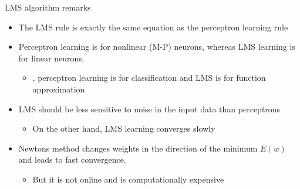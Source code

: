 \documentclass[notes]{beamer}
\providecommand{\tightlist}{%
  \setlength{\itemsep}{0pt}\setlength{\parskip}{0pt}}
\begin{document}
\begin{frame}{LMS algorithm remarks}

\begin{itemize}
\tightlist
\item
  The LMS rule is exactly the same equation as the perceptron learning
  rule
\item
  Perceptron learning is for nonlinear (M-P) neurons, whereas LMS
  learning is for linear neurons.

  \begin{itemize}
  \tightlist
  \item
    \ie , perceptron learning is for classification and LMS is for
    function approximation
  \end{itemize}
\item
  LMS should be less sensitive to noise in the input data than
  perceptrons

  \begin{itemize}
  \tightlist
  \item
    On the other hand, LMS learning converges slowly
  \end{itemize}
\item
  Newtons method changes weights in the direction of the minimum
  \(E(w)\) and leads to fast convergence.

  \begin{itemize}
  \tightlist
  \item
    But it is not online and is computationally expensive
  \end{itemize}
\end{itemize}

\end{frame}
\end{document}
